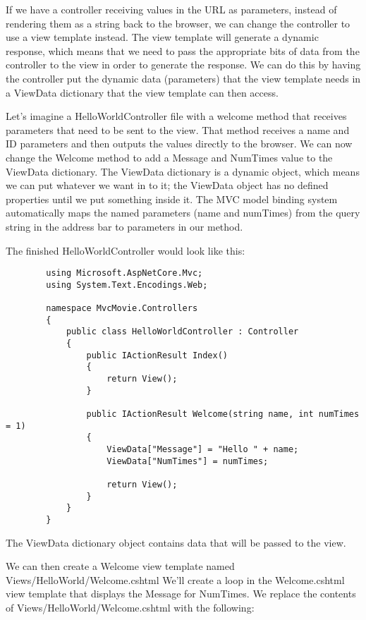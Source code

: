 \documentclass{report}
\begin{document}
    If we have a controller receiving values in the URL as parameters, instead
    of rendering them as a string back to the browser, we can change the controller
    to use a view template instead. The view template will generate a dynamic
    response, which means that we need to pass the appropriate bits of data from
    the controller to the view in order to generate the response.
    We can do this by having the controller put the dynamic data (parameters) that
    the view template needs in a ViewData dictionary that the view template can then
    access.

    Let's imagine a HelloWorldController file with a welcome method
    that receives parameters that need to be sent to the view.
    That method receives a name and ID parameters and then outputs the
    values directly to the browser. We can now change the Welcome method
    to add a Message and NumTimes value to the ViewData dictionary. The
    ViewData dictionary is a dynamic object, which means we can put whatever
    we want in to it; the ViewData object has no defined properties until we
    put something inside it. The MVC model binding system automatically maps
    the named parameters (name and numTimes) from the query string in the
    address bar to parameters in our method.

    The finished HelloWorldController would look like this:
    \lstset{style=sharpc}
    \begin{lstlisting}
        using Microsoft.AspNetCore.Mvc;
        using System.Text.Encodings.Web;

        namespace MvcMovie.Controllers
        {
            public class HelloWorldController : Controller
            {
                public IActionResult Index()
                {
                    return View();
                }

                public IActionResult Welcome(string name, int numTimes = 1)
                {
                    ViewData["Message"] = "Hello " + name;
                    ViewData["NumTimes"] = numTimes;

                    return View();
                }
            }
        }
    \end{lstlisting}

    The ViewData dictionary object contains data that will be passed to the view.

    We can then create a Welcome view template named Views/HelloWorld/Welcome.cshtml
    We'll create a loop in the Welcome.cshtml view template that displays the Message
    for NumTimes. We replace the contents of Views/HelloWorld/Welcome.cshtml with the
    following:
\end{document}
